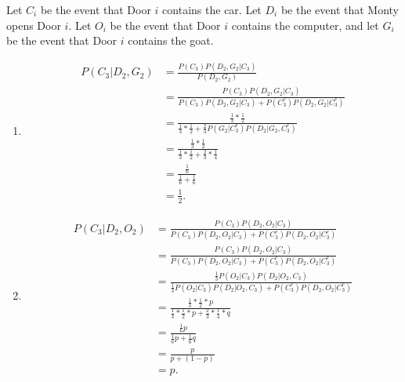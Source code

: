 Let $C_{i}$ be the event that Door $i$ contains the car. Let $D_{i}$ be the
event that Monty opens Door $i$. Let $O_{i}$ be the event that Door $i$
contains the computer, and let $G_{i}$ be the event that Door $i$ contains the
goat.

\begin{enumerate}[label=(\alph*)]
\item
\begin{align*}
P(C_{3}|D_{2}, G_{2}) &= \frac{P(C_{3})P(D_{2}, G_{2}|C_{3})}{P(D_{2}, G_{2})}
\\
&= \frac{P(C_{3})P(D_{2}, G_{2}|C_{3})}{P(C_{3})P(D_{2}, G_{2}|C_{3}) + P(C_{3}^
{c})P(D_{2}, G_{2}|C_{3}^{c})} \\
&= \frac{\frac{1}{3}*\frac{1}{2}}{\frac{1}{3}*\frac{1}{2} + \frac{2}{3}P(G_
{2}|C_{3}^{c})P(D_{2}|G_{2}, C_{3}^{c})} \\
&= \frac{\frac{1}{3}*\frac{1}{2}}{\frac{1}{3}*\frac{1}{2} + \frac{2}{3}*\frac{1}
{4}} \\
&= \frac{\frac{1}{6}}{\frac{1}{6} + \frac{1}{6}} \\ 
&= \frac{1}{2}.
\end{align*}

\item
\begin{align*}
P(C_{3}|D_{2}, O_{2}) &= \frac{P(C_{3})P(D_{2}, O_{2} | C_{3})}{P(C_{3})P(D_{2},
O_{2} | C_{3}) + P(C_{3}^{c})P(D_{2}, O_{2} | C_{3}^{c})} \\
&= \frac{P(C_{3})P(D_{2}, O_{2} | C_{3})}{P(C_{3})P(D_{2}, O_{2} | C_{3}) + P(C_
{3}^{c})P(D_{2}, O_{2} | C_{3}^{c})} \\
&= \frac{\frac{1}{3}P(O_{2}|C_{3})P(D_{2}|O_{2}, C_{3})}{\frac{1}{3}P(O_{2}|C_
{3})P(D_{2}|O_{2}, C_{3}) + P(C_{3}^{c})P(D_{2}, O_{2} | C_{3}^{c})} \\
&= \frac{\frac{1}{3}*\frac{1}{2}*p}{\frac{1}{3}*\frac{1}{2}*p + \frac{2}
{3}*\frac{1}{4}*q} \\
&= \frac{\frac{1}{6}p}{\frac{1}{6}p + \frac{1}{6}q} \\
&= \frac{p}{p+(1-p)} \\
&= p.
\end{align*}
\end{enumerate}
